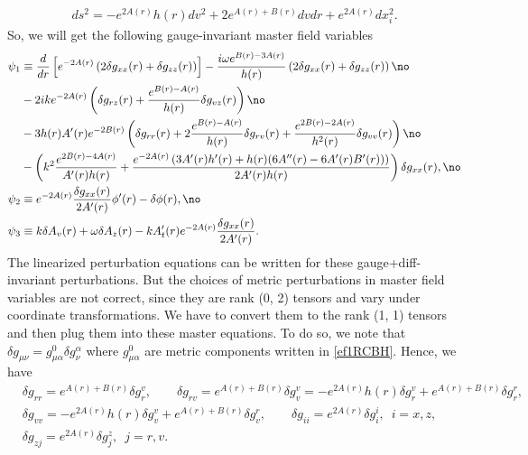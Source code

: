 \documentclass[preprintnumbers,aps,prd,longbibliography,nofootinbib,nobibnotes,amsmath,amssymb]{revtex4}
\begin{document}
\begin{align}\label{ef1RCBH}
ds^2=-e^{2A(r)}h(r)dv^2+2e^{A(r)+B(r)}dvdr+e^{2A(r)}dx_i^2.
\end{align}
So, we will get the following gauge-invariant master field variables
\begin{align}\label{gi1RCBH}
	\psi_1 &\equiv \frac{d}{dr}\left[e^{- 2 A(r)}\left(2\delta g_{x x}(r)+ \delta g_{z z}(r)\right)\right] - \frac{i \omega e^{B(r) - 3 A(r)}}{h(r)}  \left(2\delta g_{x x}(r) + \delta g_{z z}(r)\right)\no\\
	& - 2 i k e^{- 2 A(r)} \left(\delta g_{r z}(r) + \frac{e^{B(r) -  A(r)}}{h(r)}\delta g_{v z}(r)\right) \no\\
	&- 3 h(r) A'(r) e^{- 2 B(r)}\left(\delta g_{rr}(r) + 2 \frac{e^{B(r) -  A(r)}}{h(r)}\delta g_{r v}(r) + \frac{e^{2B(r) -  2 A(r)}}{h^2(r)} \delta g_{v v}(r)\right) \no\\
	& - \left( k^2\frac{e^{2 B(r) - 4 A(r)}}{A'(r) h(r)} + \frac{e^{-2 A(r)} \left( 3 A'(r) h'(r) + h(r) (6 A''(r) - 6 A'(r) B'(r))\right)}{ 2 A'(r) h(r)} \right) \delta g_{x x}(r),\no\\
	\psi_2 & \equiv e^{- 2 A(r)}\frac{\delta g_{x x}(r)}{2 A'(r)} \phi'(r) - \delta \phi(r),\no\\
	\psi_3 &\equiv k \delta A_v(r) + \omega \delta A_z(r) - k A_t'(r) e^{- 2 A(r)}  \frac{\delta g_{x x}(r)}{ 2 A'(r)}.
\end{align}
 The linearized perturbation equations can  be written  for these gauge+diff-invariant perturbations.  But  the choices of metric perturbations in master field variables are not correct, since they are rank (0, 2) tensors and vary under coordinate transformations. We have to convert them to the rank (1, 1) tensors and then plug them into these master equations. To do so, we note that $\delta g_{\mu \nu} = g^0_{\mu \alpha} \delta g^\alpha_\nu$ where $g^0_{\mu \alpha}$ are metric components written in \eqref{ef1RCBH}. Hence, we have
\begin{align}
	&\delta g_{r r} = e^{A(r)+B(r)} \delta g^v_r, \qquad \delta g_{r v} =  e^{A(r)+B(r)} \delta g^v_v = - e^{2 A(r)} h(r) \delta g^v_r +  e^{A(r)+B(r)} \delta g^r_r, \nonumber\\
	& \delta g_{v v} = - e^{2 A(r)} h(r) \delta g^v_v +  e^{A(r)+B(r)} \delta g^r_v, \qquad \delta g_{i i} = e^{2 A(r)} \delta g^i_i, \,\,\, i = x, z, \nonumber\\
	& \delta g_{z j} = e^{2 A(r)} \delta g^z_j, \,\,\, j = r, v.
\end{align}
\end{document}
